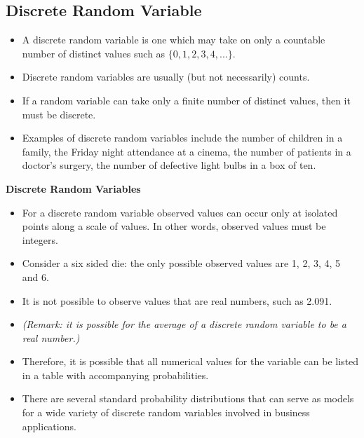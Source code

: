 \documentclass[]{report}
\begin{document}
\subsection{Discrete Random Variable}
\begin{itemize}
\item A discrete random variable is one which may take on only a countable number of distinct values such as $\{0, 1, 2, 3, 4, ... \}$.\item Discrete random variables are usually (but not necessarily) counts. \item If a random variable can take only a finite number of distinct values, then it must be discrete. 
\item Examples of discrete random variables include the number of children in a family, the Friday night attendance at a cinema, the number of patients in a doctor's surgery, the number of defective light bulbs in a box of ten.
\end{itemize}

\textbf{Discrete Random Variables}
\begin{itemize}
\item For a discrete random variable observed values can occur only at isolated points along a scale of values. In other words, observed values must be integers.
\item Consider a six sided die: the only possible observed values are 1, 2, 3, 4, 5 and 6. 
\item It is not possible to observe values that are real numbers, such as 2.091.

\item \textit{(Remark: it is possible for the average of a discrete random variable to be a real number.)}
\item Therefore, it is possible that all numerical values for the variable can be listed in a table with accompanying
probabilities. 
\item
There are several standard probability distributions that can serve as models for a wide variety of discrete random variables involved in business applications. 
\end{itemize}

\newpage

\end{document}
